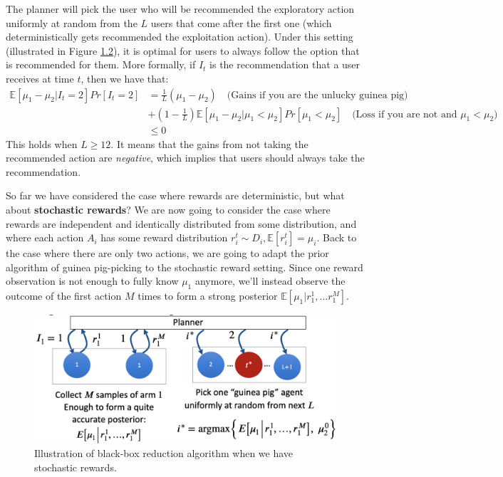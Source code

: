 \documentclass[
  letterpaper,
  DIV=11,
  numbers=noendperiod,
  oneside]{scrreprt}
\theoremstyle{remark}
\begin{document}
The planner will pick the user who will be recommended the exploratory
action uniformly at random from the \(L\) users that come after the
first one (which deterministically gets recommended the exploitation
action). Under this setting (illustrated in Figure
\hyperref[fig:deterministic-guinea-pig]{1.2}), it is optimal for users
to always follow the option that is recommended for them. More formally,
if \(I_t\) is the recommendation that a user receives at time \(t\),
then we have that: \[\begin{split}
    \mathbb{E}[\mu_1 - \mu_2 | I_t = 2] Pr[I_t = 2] &= \frac{1}{L} (\mu_1 - \mu_2) \quad \text{(Gains if you are the unlucky guinea pig)}\\
    &+ (1 - \frac{1}{L}) \mathbb{E}[\mu_1 - \mu_2 | \mu_1 < \mu_2] Pr[\mu_1 < \mu_2] \quad \text{(Loss if you are not and $\mu_1 < \mu_2$)}\\
    &\leq 0
\end{split}\] This holds when \(L \geq 12\). It means that the gains
from not taking the recommended action are \emph{negative}, which
implies that users should always take the recommendation.

So far we have considered the case where rewards are deterministic, but
what about \textbf{stochastic rewards}? We are now going to consider the
case where rewards are independent and identically distributed from some
distribution, and where each action \(A_i\) has some reward distribution
\(r_i^t \sim D_i, \mathbb{E}[r_i^t] = \mu_i\). Back to the case where
there are only two actions, we are going to adapt the prior algorithm of
guinea pig-picking to the stochastic reward setting. Since one reward
observation is not enough to fully know \(\mu_1\) anymore, we'll instead
observe the outcome of the first action \(M\) times to form a strong
posterior \(\mathbb{E}[\mu_1 | r_1^1, \ldots r_1^M]\).

\begin{figure}

{\centering \includegraphics{src/Figures/stochastic_guinea_pig.png}

}

\caption{Illustration of black-box reduction algorithm when we have
stochastic rewards.}

\end{figure}%
\end{document}
